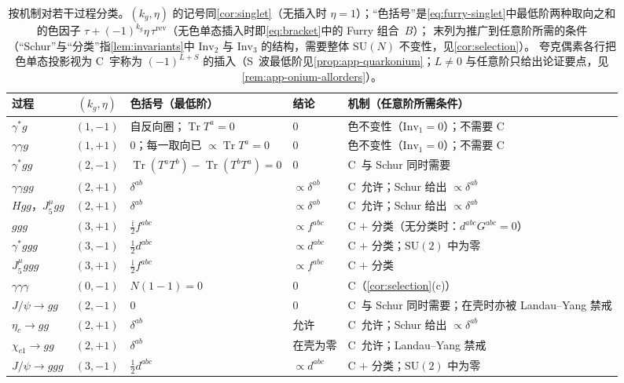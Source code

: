 \documentclass[UTF8,a4paper,11pt,fontset=fandol]{ctexart}
\theoremstyle{cplain}
\theoremstyle{cdefinition}
\theoremstyle{cremark}
\numberwithin{equation}{section}
\DeclareMathOperator{\Tr}{Tr}
\newcommand{\ii}{\mathrm{i}}                        %
\begin{document}
\begin{table}[tb]
\centering
\caption{按机制对若干过程分类。$(k_g,\eta)$ 的记号同\cref{cor:singlet}（无插入时 $\eta=1$）；“色括号”是\cref{eq:furry-singlet}中最低阶两种取向之和的色因子 $\tau+(-1)^{k_g}\eta\,\tau^{\mathrm{rev}}$（无色单态插入时即\cref{eq:bracket}中的 Furry 组合~$B$）；
末列为推广到任意阶所需的条件（“Schur”与“分类”指\cref{lem:invariants}中 $\mathrm{Inv}_2$ 与 $\mathrm{Inv}_3$ 的结构，需要整体 $\mathrm{SU}(N)$ 不变性，见\cref{cor:selection}）。
夸克偶素各行把色单态投影视为 C~宇称为 $(-1)^{L+S}$ 的插入（S~波最低阶见\cref{prop:app-quarkonium}；$L\neq0$ 与任意阶只给出论证要点，见\cref{rem:app-onium-allorders}）。}
\label{tab:thmI-examples}
\small
\renewcommand{\arraystretch}{1.1}
\begin{tabularx}{\textwidth}{@{}l c l l >{\raggedright\arraybackslash}X@{}}
\toprule
过程 & $(k_g,\eta)$ & 色括号（最低阶） & 结论 & 机制（任意阶所需条件） \\
\midrule
$\gamma^*g$ & $(1,-1)$ & 自反向圈；$\Tr T^a=0$ & $0$ & 色不变性（$\mathrm{Inv}_1=0$）；不需要 C \\
$\gamma\gamma g$ & $(1,+1)$ & $0$；每一取向已 $\propto\Tr T^a=0$ & $0$ & 色不变性（$\mathrm{Inv}_1=0$）；不需要 C \\
$\gamma^*gg$ & $(2,-1)$ & $\Tr(T^aT^b)-\Tr(T^bT^a)=0$ & $0$ & C~与 Schur 同时需要 \\
$\gamma\gamma gg$ & $(2,+1)$ & $\delta^{ab}$ & $\propto\delta^{ab}$ & C~允许；Schur 给出 $\propto\delta^{ab}$ \\
$Hgg$，$J_5^\mu gg$ & $(2,+1)$ & $\delta^{ab}$ & $\propto\delta^{ab}$ & C~允许；Schur 给出 $\propto\delta^{ab}$ \\
$ggg$ & $(3,+1)$ & $\frac{\ii}{2}f^{abc}$ & $\propto f^{abc}$ & C $+$ 分类（无分类时：$d^{abc}G^{abc}=0$） \\
$\gamma^*ggg$ & $(3,-1)$ & $\frac12d^{abc}$ & $\propto d^{abc}$ & C $+$ 分类；$\mathrm{SU}(2)$ 中为零 \\
$J_5^\mu ggg$ & $(3,+1)$ & $\frac{\ii}{2}f^{abc}$ & $\propto f^{abc}$ & C $+$ 分类 \\
$\gamma\gamma\gamma$ & $(0,-1)$ & $N(1-1)=0$ & $0$ & C（\cref{cor:selection}(c)） \\
\midrule
$J/\psi\to gg$ & $(2,-1)$ & $0$ & $0$ & C~与 Schur 同时需要；在壳时亦被 Landau--Yang 禁戒 \\
$\eta_c\to gg$ & $(2,+1)$ & $\delta^{ab}$ & 允许 & C~允许；Schur 给出 $\propto\delta^{ab}$ \\
$\chi_{c1}\to gg$ & $(2,+1)$ & $\delta^{ab}$ & 在壳为零 & C~允许；Landau--Yang 禁戒 \\
$J/\psi\to ggg$ & $(3,-1)$ & $\frac12d^{abc}$ & $\propto d^{abc}$ & C $+$ 分类；$\mathrm{SU}(2)$ 中为零 \\
\bottomrule
\end{tabularx}
\end{table}
\end{document}
